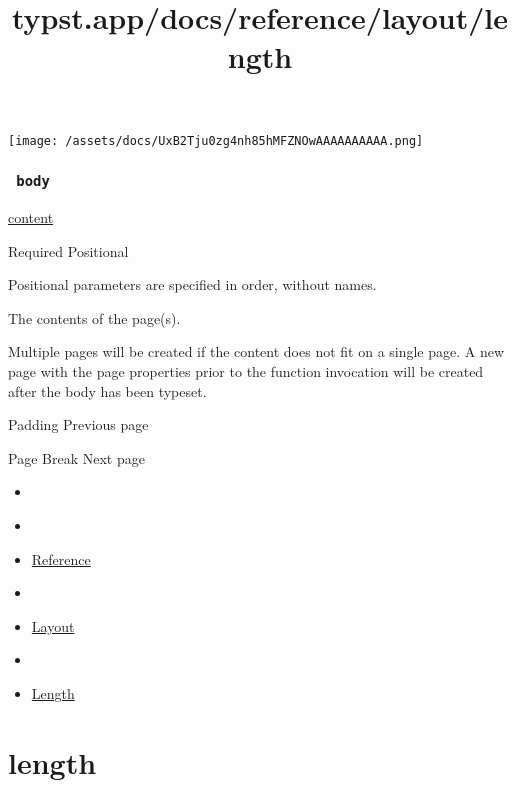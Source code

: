 \texttt{[image: /assets/docs/UxB2Tju0zg4nh85hMFZNOwAAAAAAAAAA.png]}

\subsubsection{\texorpdfstring{\texttt{\ body\ }}{ body }}\label{parameters-body}

\href{/docs/reference/foundations/content/}{content}

{Required} {{ Positional }}

\label{parameters-body-positional-tooltip}
Positional parameters are specified in order, without names.

The contents of the page(s).

Multiple pages will be created if the content does not fit on a single
page. A new page with the page properties prior to the function
invocation will be created after the body has been typeset.

\href{/docs/reference/layout/pad/}{\pandocbounded{}}

{ Padding } { Previous page }

\href{/docs/reference/layout/pagebreak/}{\pandocbounded{}}

{ Page Break } { Next page }


\title{typst.app/docs/reference/layout/length}

\begin{itemize}
\tightlist
\item
  \href{/docs}{}
\item
  
\item
  \href{/docs/reference/}{Reference}
\item
  
\item
  \href{/docs/reference/layout/}{Layout}
\item
  
\item
  \href{/docs/reference/layout/length/}{Length}
\end{itemize}

\section{\texorpdfstring{{ length }}{ length }}\label{summary}

